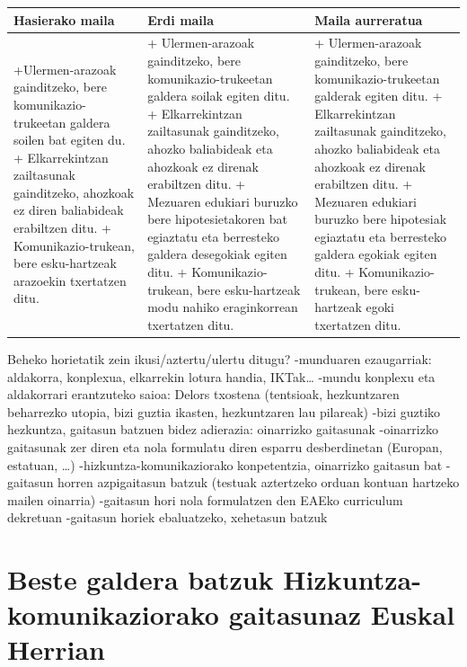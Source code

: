 \documentclass[
]{book}
\begin{document}
\begin{longtable}[]{@{}
  >{\raggedright\arraybackslash}p{}
  >{\raggedright\arraybackslash}p{}
  >{\raggedright\arraybackslash}p{}@{}}
\toprule
Hasierako maila & Erdi maila & Maila aurreratua \\
\midrule
\endhead
+Ulermen-arazoak gainditzeko, bere komunikazio-trukeetan galdera soilen bat egiten du. + Elkarrekintzan zailtasunak gainditzeko, ahozkoak ez diren baliabideak erabiltzen ditu. + Komunikazio-trukean, bere esku-hartzeak arazoekin txertatzen ditu. & + Ulermen-arazoak gainditzeko, bere komunikazio-trukeetan galdera soilak egiten ditu. + Elkarrekintzan zailtasunak gainditzeko, ahozko baliabideak eta ahozkoak ez direnak erabiltzen ditu. + Mezuaren edukiari buruzko bere hipotesietakoren bat egiaztatu eta berresteko galdera desegokiak egiten ditu. + Komunikazio-trukean, bere esku-hartzeak modu nahiko eraginkorrean txertatzen ditu. & + Ulermen-arazoak gainditzeko, bere komunikazio-trukeetan galderak egiten ditu. + Elkarrekintzan zailtasunak gainditzeko, ahozko baliabideak eta ahozkoak ez direnak erabiltzen ditu. + Mezuaren edukiari buruzko bere hipotesiak egiaztatu eta berresteko galdera egokiak egiten ditu. + Komunikazio-trukean, bere esku-hartzeak egoki txertatzen ditu. \\
\bottomrule
\end{longtable}

Beheko horietatik zein ikusi/aztertu/ulertu ditugu?
-munduaren ezaugarriak: aldakorra, konplexua, elkarrekin lotura handia, IKTak\ldots{}
-mundu konplexu eta aldakorrari erantzuteko saioa: Delors txostena (tentsioak, hezkuntzaren beharrezko utopia, bizi guztia ikasten, hezkuntzaren lau pilareak)
-bizi guztiko hezkuntza, gaitasun batzuen bidez adierazia: oinarrizko gaitasunak
-oinarrizko gaitasunak zer diren eta nola formulatu diren esparru desberdinetan (Europan, estatuan, \ldots)
-hizkuntza-komunikaziorako konpetentzia, oinarrizko gaitasun bat
-gaitasun horren azpigaitasun batzuk (testuak aztertzeko orduan kontuan hartzeko mailen oinarria)
-gaitasun hori nola formulatzen den EAEko curriculum dekretuan
-gaitasun horiek ebaluatzeko, xehetasun batzuk

\hypertarget{beste-galdera-batzuk-hizkuntza-komunikaziorako-gaitasunaz-euskal-herrian}{%
\section{Beste galdera batzuk Hizkuntza-komunikaziorako gaitasunaz Euskal Herrian}\label{beste-galdera-batzuk-hizkuntza-komunikaziorako-gaitasunaz-euskal-herrian}}
\end{document}
